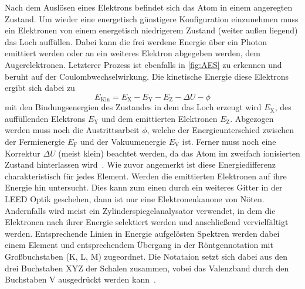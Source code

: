         Nach dem Auslösen eines Elektrons befindet sich das Atom in einem angeregten Zustand.
        Um wieder eine energetisch günstigere Konfiguration einzunehmen muss ein Elektronen von einem energetisch niedrigerem Zustand (weiter außen liegend) das Loch auffüllen.
        Dabei kann die frei werdene Energie über ein Photon emittiert werden oder an ein weiteres Elektron abgegeben werden, dem Augerelektronen.
        Letzterer Prozess ist ebenfalls in \autoref{fig:AES} zu erkennen und beruht auf der Coulombwechselwirkung.
        Die kinetische Energie diese Elektrons ergibt sich dabei zu
        \begin{equation}
            E_\text{Kin} = E_\text{X} - E_\text{Y} -E_\text{Z} - \Delta U - \phi
        \end{equation}
        mit den Bindungsenergien des Zustandes in dem das Loch erzeugt wird $E_\text{X}$, des auffüllenden Elektrons $E_\text{Y}$ und dem emittierten Elektronen $E_\text{Z}$.
        Abgezogen werden muss noch die Austrittsarbeit $\phi$, welche der Energieunterschied zwischen der Fermienergie $E_\text{F}$ und der Vakuumenergie $E_\text{V}$ ist.
        Ferner muss noch eine Korrektur $\Delta U$ (meist klein) beachtet werden, da das Atom im zweifach ionisierten Zustand hinterlassen wird~\cite{Fauster}.
        Wie zuvor angemerkt ist diese Energiedifferenz charakteristisch für jedes Element.
        Werden die emittierten Elektronen auf ihre Energie hin untersucht.
        Dies kann zum einen durch ein weiteres Gitter in der LEED Optik geschehen, dann ist nur eine Elektronenkanone von Nöten.
        Andernfalls wird meist ein Zylinderspiegelanalysator verwendet, in dem die Elektronen nach ihrer Energie selektiert werden und anschließend vervielfältigt werden.
        Entsprechende Linien in Energie aufgelösten Spektren werden dabei einem Element und entsprechendem Übergang in der Röntgennotation mit Großbuchstaben (K, L, M) zugeordnet.
        Die Notataion setzt sich dabei aus den drei Buchstaben XYZ der Schalen zusammen, vobei das Valenzband durch den Buchstaben V ausgedrückt werden kann~\cite{Fauster}.

